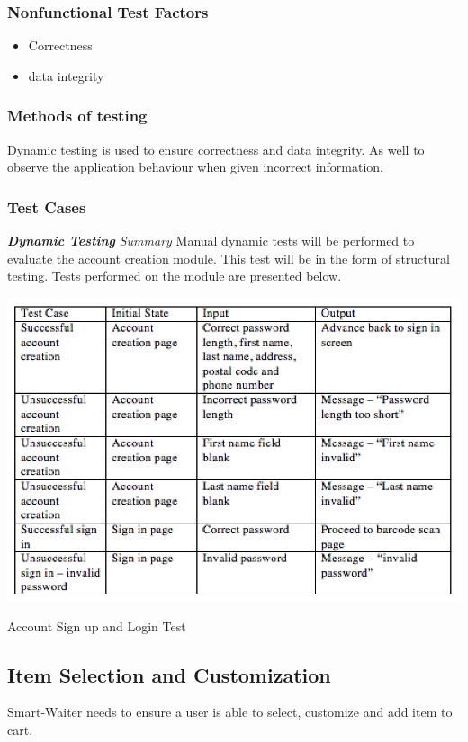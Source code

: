 \documentclass[12pt]{article}
\begin{document}
\subsubsection{Nonfunctional Test Factors}
\begin{itemize}
  \item Correctness
  \item data integrity
\end{itemize}


\subsubsection{Methods of testing}
Dynamic testing is used to ensure correctness and data integrity. As well to observe the application behaviour when given incorrect information.
\subsubsection{Test Cases}
\textbf{\textit{Dynamic Testing}}\newline
\newline
\textit{Summary}\newline
Manual dynamic tests will be performed to evaluate the account creation module. This test will be in the form of structural testing. Tests performed on the module are presented below. 
\pagebreak
\begin{table}[h]
\includegraphics[width=\textwidth,height=\textheight,keepaspectratio]{accountTC.png}
  \caption{Account Sign up and Login Test}
\end{table}
\subsection{Item Selection and Customization}
Smart-Waiter needs to ensure a user is able to select, customize and add item to cart. 
\end{document}
